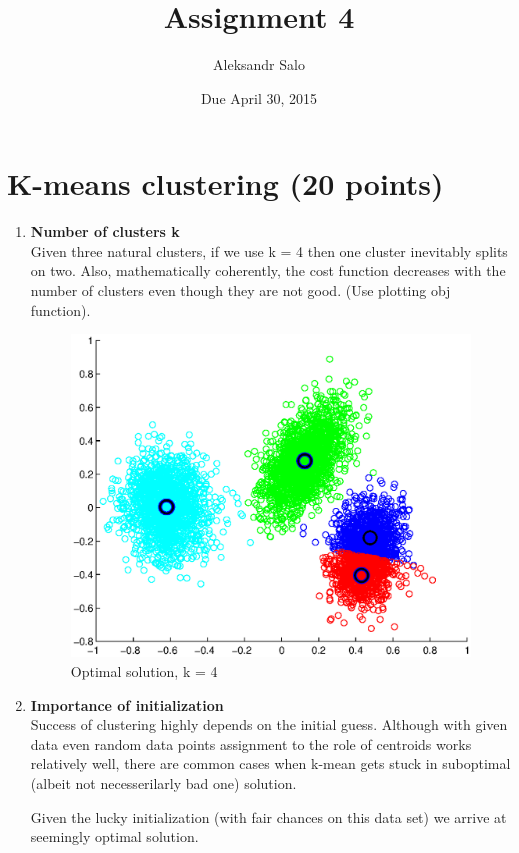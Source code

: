 \documentclass{article}
\title{Assignment 4}
\date{Due April 30, 2015}
\author{Aleksandr Salo}
\begin{document}
\maketitle

\section{K-means clustering (20 points)}
	\begin{enumerate}
		\item  \textbf{Number of clusters k}\\
		Given three natural clusters, if we use k = 4 then one cluster inevitably splits on two. Also, mathematically coherently, the cost function decreases with the number of clusters even though they are not good. (Use plotting obj function). 
		\begin{figure}[h]
			\centering
			\includegraphics[width=.9\linewidth]{k4_split.eps}
			\caption{Optimal solution, k = 4}
			\label{fig:sub1}
		\end{figure}%
		\pagebreak
		
		\item \textbf{Importance of initialization}\\
		Success of clustering highly depends on the initial guess. Although with given data even random data points assignment to the role of centroids works relatively well, there are common cases when k-mean gets stuck in suboptimal (albeit not necesserilarly bad one) solution.
		
		Given the lucky initialization (with fair chances on this data set) we arrive at seemingly optimal solution.
		

\end{enumerate}
\end{document}

